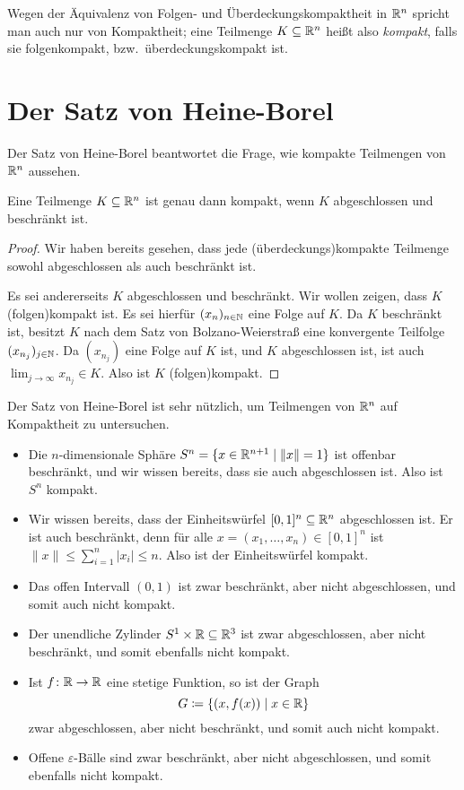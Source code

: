\documentclass[a4paper,10pt]{article}
\begin{document}
Wegen der Äquivalenz von Folgen- und Überdeckungskompaktheit in $\mathbb{R}^n$ spricht man auch nur von Kompaktheit; eine Teilmenge $K \subseteq \mathbb{R}^n$ heißt also \emph{kompakt}, falls sie folgenkompakt, bzw.\ überdeckungskompakt ist.





\section{Der Satz von Heine-Borel}
Der Satz von Heine-Borel beantwortet die Frage, wie kompakte Teilmengen von $\mathbb{R}^n$ aussehen.


\begin{thrm}
 Eine Teilmenge $K \subseteq \mathbb{R}^n$ ist genau dann kompakt, wenn $K$ abgeschlossen und beschränkt ist.
\end{thrm}
\begin{proof}
 Wir haben bereits gesehen, dass jede (überdeckungs)kompakte Teilmenge sowohl abgeschlossen als auch beschränkt ist.
 
 Es sei andererseits $K$ abgeschlossen und beschränkt. Wir wollen zeigen, dass $K$ (folgen)kompakt ist. Es sei hierfür $(x_n)_{n \in \mathbb{N}}$ eine Folge auf $K$. Da $K$ beschränkt ist, besitzt $K$ nach dem Satz von Bolzano-Weierstraß eine konvergente Teilfolge $(x_{n_j})_{j \in \mathbb{N}}$. Da $(x_{n_j})$ eine Folge auf $K$ ist, und $K$ abgeschlossen ist, ist auch $\lim_{j \to \infty} x_{n_j} \in K$. Also ist $K$ (folgen)kompakt.
\end{proof}


Der Satz von Heine-Borel ist sehr nützlich, um Teilmengen von $\mathbb{R}^n$ auf Kompaktheit zu untersuchen.


\begin{bsp}
 \begin{itemize}
  \item
   Die $n$-dimensionale Sphäre $S^n = \{x \in \mathbb{R}^{n+1} \mid \|x\| = 1\}$ ist offenbar beschränkt, und wir wissen bereits, dass sie auch abgeschlossen ist. Also ist $S^n$ kompakt.
  \item
   Wir wissen bereits, dass der Einheitswürfel $[0,1]^n \subseteq \mathbb{R}^n$ abgeschlossen ist. Er ist auch beschränkt, denn für alle $x = (x_1, \dotsc, x_n) \in [0,1]^n$ ist $\|x\| \leq \sum_{i=1}^n |x_i| \leq n$. Also ist der Einheitswürfel kompakt.
  \item
   Das offen Intervall $(0,1)$ ist zwar beschränkt, aber nicht abgeschlossen, und somit auch nicht kompakt.
  \item
   Der unendliche Zylinder $S^1 \times \mathbb{R} \subseteq \mathbb{R}^3$ ist zwar abgeschlossen, aber nicht beschränkt, und somit ebenfalls nicht kompakt.
  \item
   Ist $f \colon \mathbb{R} \to \mathbb{R}$ eine stetige Funktion, so ist der Graph
   \[
    G \coloneqq \{(x,f(x)) \mid x \in \mathbb{R}\}
   \]
   zwar abgeschlossen, aber nicht beschränkt, und somit auch nicht kompakt.
  \item
   Offene $\varepsilon$-Bälle sind zwar beschränkt, aber nicht abgeschlossen, und somit ebenfalls nicht kompakt.
  \end{itemize}
\end{bsp}
\end{document}
